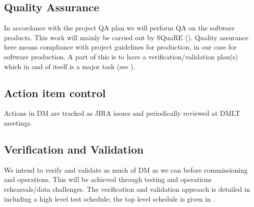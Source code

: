 \subsection {Quality Assurance  } \label{sect:pa}

In accordance with the project QA plan  we will perform QA on the software products.
This work will mainly be carried out by SQuaRE ().
Quality assurance here means compliance with project guidelines for production, in our case for software production.
A part of this is to have a verification/validation plan(s) which in and of itself is a major task (see ).


\subsection{Action item control}
Actions in DM are tracked as JIRA issues and periodically reviewed at DMLT meetings.


\subsection {Verification and Validation } \label{sect:vanv}

We intend to verify and validate as much of DM as we can before commissioning and operations.
This will be achieved through testing and operations rehearsals/data challenges.
The verification and validation approach is detailed in  including a high level test schedule;
the top level schedule is given in .
